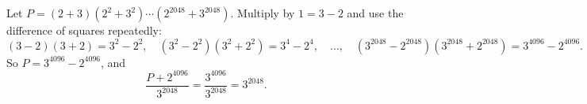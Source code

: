 Let $P=(2+3)\left(2^2+3^2\right)\cdots\left(2^{2048}+3^{2048}\right)$. Multiply by $1=3-2$ and use the difference of squares repeatedly:
\[
(3-2)(3+2)=3^2-2^2,\quad \left(3^2-2^2\right)\left(3^2+2^2\right)=3^4-2^4,\quad\dots,\quad \left(3^{2048}-2^{2048}\right)\left(3^{2048}+2^{2048}\right)=3^{4096}-2^{4096}.
\]
So $P=3^{4096}-2^{4096}$, and
\[
\dfrac{P+2^{4096}}{3^{2048}}=\dfrac{3^{4096}}{3^{2048}}=\boxed{3^{2048}}.
\]
